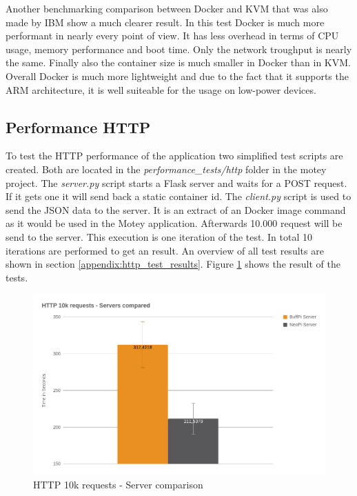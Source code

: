 Another benchmarking comparison\autocite{Russell:Performance:2014} between Docker and \ac{KVM} that was also made by IBM show a much clearer result.
In this test Docker is much more performant in nearly every point of view.
It has less overhead in terms of \ac{CPU} usage\autocite[cf.][p. 25]{Russell:Performance:2014}, memory performance\autocite[cf.][p. 50]{Russell:Performance:2014} and boot time\autocite[cf.][p. 24]{Russell:Performance:2014}.
Only the network troughput is nearly the same.\autocite[cf.][p. 52]{Russell:Performance:2014}
Finally also the container size is much smaller in Docker than in \ac{KVM}.\autocite[cf.][p. 66]{Russell:Performance:2014}
Overall Docker is much more lightweight and due to the fact that it supports the ARM architecture, it is well suiteable for the usage on low-power devices.

\subsection{Performance HTTP}
To test the \ac{HTTP} performance of the application two simplified test scripts are created.
Both are located in the \textit{performance\_tests/http} folder in the motey project.
The \textit{server.py} script starts a Flask server and waits for a POST request.
If it gets one it will send back a static container id.
The \textit{client.py} script is used to send the \ac{JSON} data to the server.
It is an extract of an Docker image command as it would be used in the Motey application.
Afterwards 10.000 request will be send to the server.
This execution is one iteration of the test.
In total 10 iterations are performed to get an result.
An overview of all test results are shown in section \ref{appendix:http_test_results}.
Figure \ref{fig:performance_http_server_comparison} shows the result of the tests.

\begin{figure}[H]
    \centering
    \includegraphics[width=\textwidth]{resources/images/performance_http_server_comparison.png}
    \caption[HTTP 10k requests - Server comparison]{HTTP 10k requests - Server comparison}
    \label{fig:performance_http_server_comparison}
\end{figure}

